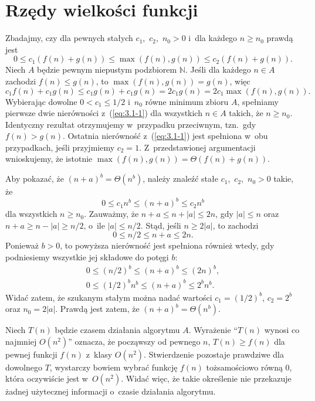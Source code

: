 \chapter{Rzędy wielkości funkcji}


\exercise %
Zbadajmy, czy dla pewnych stałych $c_1$,~$c_2$,~$n_0>0$ i~dla każdego $n\ge n_0$ prawdą jest
\[
	0 \le c_1(f(n)+g(n)) \le \max(f(n),g(n)) \le c_2(f(n)+g(n)). \tag{$*$}\label{eq:3.1-1}
\]
Niech $A$ będzie pewnym niepustym podzbiorem $\mathbb{N}$. Jeśli dla każdego $n\in A$ zachodzi $f(n)\le g(n)$, to $\max(f(n),g(n))=g(n)$, więc
\[
	c_1f(n)+c_1g(n) \le c_1g(n)+c_1g(n) = 2c_1g(n) = 2c_1\max(f(n),g(n)).
\]
Wybierając dowolne $0<c_1\le1/2$ i~$n_0$ równe minimum zbioru $A$, spełniamy pierwsze dwie nierówności z~(\ref{eq:3.1-1}) dla wszystkich $n\in A$ takich, że $n\ge n_0$. Identyczny rezultat otrzymujemy w~przypadku przeciwnym, tzn.\ gdy $f(n)>g(n)$. Ostatnia nierówność z~(\ref{eq:3.1-1}) jest spełniona w~obu przypadkach, jeśli przyjmiemy $c_2=1$. Z~przedstawionej argumentacji wnioskujemy, że istotnie $\max(f(n),g(n))=\Theta(f(n)+g(n))$.

\exercise %
Aby pokazać, że $(n+a)^b=\Theta(n^b)$, należy znaleźć stałe $c_1$,~$c_2$,~$n_0>0$ takie, że
\[
	0 \le c_1n^b \le (n+a)^b \le c_2n^b
\]
dla wszystkich $n\ge n_0$. Zauważmy, że $n+a\le n+|a|\le2n$, gdy $|a|\le n$ oraz $n+a\ge n-|a|\ge n/2$, o~ile $|a|\le n/2$. Stąd, jeśli $n\ge 2|a|$, to zachodzi
\[
	0 \le n/2 \le n+a \le 2n.
\]
Ponieważ $b>0$, to powyższa nierówność jest spełniona również wtedy, gdy podniesiemy wszystkie jej składowe do potęgi $b$:
\begin{gather*}
	0 \le (n/2)^b \le (n+a)^b \le (2n)^b, \\
	0 \le (1/2)^bn^b \le (n+a)^b \le 2^bn^b.
\end{gather*}
Widać zatem, że szukanym stałym można nadać wartości $c_1=(1/2)^b$, $c_2=2^b$ oraz $n_0=2|a|$. Prawdą jest zatem, że $(n+a)^b=\Theta(n^b)$.

\exercise %
Niech $T(n)$ będzie czasem działania algorytmu $A$. Wyrażenie ``$T(n)$ wynosi co najmniej $O(n^2)$'' oznacza, że począwszy od pewnego $n$, $T(n)\ge f(n)$ dla pewnej funkcji $f(n)$ z~klasy $O(n^2)$. Stwierdzenie pozostaje prawdziwe dla dowolnego $T$, wystarczy bowiem wybrać funkcję $f(n)$ tożsamościowo równą 0, która oczywiście jest w~$O(n^2)$. Widać więc, że takie określenie nie przekazuje żadnej użytecznej informacji o~czasie działania algorytmu.

